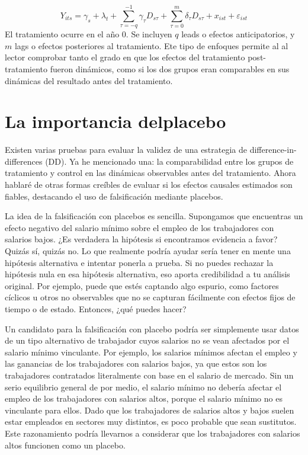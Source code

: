 \documentclass[
  letterpaper,
  DIV=11,
  numbers=noendperiod,
  oneside]{scrreprt}
\begin{document}
\[
Y_{its} = \gamma_s + \lambda_t + \sum_{\tau=-q}^{-1} \gamma_{\tau} D_{s\tau} + \sum_{\tau=0}^{m} \delta_{\tau} D_{s\tau} + x_{ist} + \varepsilon_{ist}
\] El tratamiento ocurre en el año 0. Se incluyen \(q\) leads o efectos
anticipatorios, y \(m\) lags o efectos posteriores al tratamiento. Ete
tipo de enfoques permite al al lector comprobar tanto el grado en que
los efectos del tratamiento post-tratamiento fueron dinámicos, como si
los dos grupos eran comparables en sus dinámicas del resultado antes del
tratamiento.

\hypertarget{la-importancia-delplacebo}{%
\section{La importancia delplacebo}\label{la-importancia-delplacebo}}

Existen varias pruebas para evaluar la validez de una estrategia de
difference-in-differences (DD). Ya he mencionado una: la comparabilidad
entre los grupos de tratamiento y control en las dinámicas observables
antes del tratamiento. Ahora hablaré de otras formas creíbles de evaluar
si los efectos causales estimados son fiables, destacando el uso de
falsificación mediante placebos.

La idea de la falsificación con placebos es sencilla. Supongamos que
encuentras un efecto negativo del salario mínimo sobre el empleo de los
trabajadores con salarios bajos. ¿Es verdadera la hipótesis si
encontramos evidencia a favor? Quizás sí, quizás no. Lo que realmente
podría ayudar sería tener en mente una hipótesis alternativa e intentar
ponerla a prueba. Si no puedes rechazar la hipótesis nula en esa
hipótesis alternativa, eso aporta credibilidad a tu análisis original.
Por ejemplo, puede que estés captando algo espurio, como factores
cíclicos u otros no observables que no se capturan fácilmente con
efectos fijos de tiempo o de estado. Entonces, ¿qué puedes hacer?

Un candidato para la falsificación con placebo podría ser simplemente
usar datos de un tipo alternativo de trabajador cuyos salarios no se
vean afectados por el salario mínimo vinculante. Por ejemplo, los
salarios mínimos afectan el empleo y las ganancias de los trabajadores
con salarios bajos, ya que estos son los trabajadores contratados
literalmente con base en el salario de mercado. Sin un serio equilibrio
general de por medio, el salario mínimo no debería afectar el empleo de
los trabajadores con salarios altos, porque el salario mínimo no es
vinculante para ellos. Dado que los trabajadores de salarios altos y
bajos suelen estar empleados en sectores muy distintos, es poco probable
que sean sustitutos. Este razonamiento podría llevarnos a considerar que
los trabajadores con salarios altos funcionen como un placebo.
\end{document}
